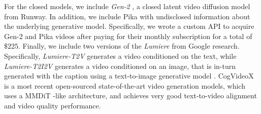 For the closed models, we include \textit{Gen-2} \cite{gen2}, a closed latent video diffusion model from Runway. In addition, we include Pika \cite{pika} with undisclosed information about the underlying generative model. Specifically, we wrote a custom API to acquire Gen-2 and Pika videos after paying for their monthly subscription for a total of $\$225$. Finally, we include two versions of the \textit{Lumiere} \cite{bar2024lumiere} from Google research. Specifically, \textit{Lumiere-T2V} generates a video conditioned on the text, while \textit{Lumiere-T2I2V} generates a video conditioned on an image, that is in-turn generated with the caption using a text-to-image generative model \cite{saharia2022photorealistic}. CogVideoX \cite{yang2024cogvideox} is a most recent open-sourced state-of-the-art video generation models, which uses a MMDiT \cite{SD3}-like architecture, and achieves very good text-to-video alignment and video quality performance.




